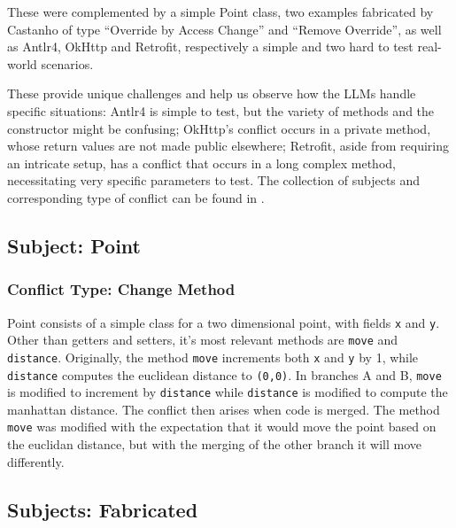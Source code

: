 These were complemented by a simple Point class, two examples fabricated by Castanho of type ``Override by Access Change'' and ``Remove Override'', as well as %
Antlr4, OkHttp and Retrofit, respectively a simple and two hard to test real-world scenarios.

These provide unique challenges and help us observe how the LLMs handle specific situations: Antlr4 is simple to test, but the variety of methods 
and the constructor might be confusing; OkHttp's conflict occurs in a private method, whose return values are not made
public elsewhere; Retrofit, aside from requiring an intricate setup, has a conflict that occurs in a long complex method,
necessitating very specific parameters to test.
The collection of subjects and corresponding type of conflict can be found in .


\subsection{Subject: Point}

\subsubsection{Conflict Type: Change Method}

Point consists of a simple class for a two dimensional point, with fields \texttt{x} and \texttt{y}.
Other than getters and setters, it's most relevant methods are \texttt{move} and \texttt{distance}.
Originally, the method \texttt{move} increments both \texttt{x} and \texttt{y} by 1, while \texttt{distance} computes the euclidean distance to \texttt{(0,0)}.
In branches A and B, \texttt{move} is modified to increment by \texttt{distance} while \texttt{distance} is modified to compute
the manhattan distance.  The conflict then arises when code is merged. The method \texttt{move} was modified with the expectation that it would move
the point based on the euclidan distance, but with the merging of the other branch it will move differently.

\subsection{Subjects: Fabricated}

